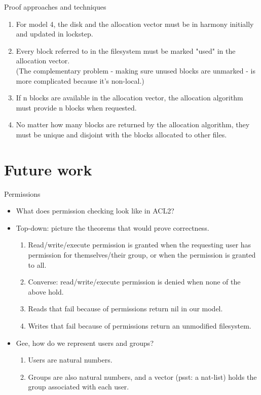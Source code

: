 \documentclass{beamer}
\begin{document}
\begin{frame}{Proof approaches and techniques}
  \begin{enumerate}
  \item For model 4, the disk and the allocation vector must be in harmony
    initially and updated in lockstep.
  \item Every block referred to in the filesystem must be marked
    "used" in the allocation vector.\\
    (The complementary problem - making sure unused
      blocks are unmarked - is more complicated because it's non-local.)
  \item If n blocks are available in the allocation vector, the
    allocation algorithm must provide n blocks when requested.
  \item No matter how many blocks are returned by the allocation
    algorithm, they must be unique and disjoint with the blocks
    allocated to other files.
  \end{enumerate}
\end{frame}

\section{Future work}

\begin{frame}{Permissions}
  \begin{itemize}
  \item What does permission checking look like in ACL2?
  \item Top-down: picture the theorems that would prove correctness.
    \begin{enumerate}
    \item Read/write/execute permission is granted when the requesting
      user has permission for themselves/their group, or when the
      permission is granted to all.
    \item Converse: read/write/execute permission is denied when none
      of the above hold.
    \item Reads that fail because of permissions return nil in our
      model.
    \item Writes that fail because of permissions return an unmodified
      filesystem.
    \end{enumerate}
  \item Gee, how do we represent users and groups?
    \begin{enumerate}
    \item Users are natural numbers.
    \item Groups are also natural numbers, and a vector (psst: a
      nat-list) holds the group associated with each user.
    \end{enumerate}
  \end{itemize}
\end{frame}
\end{document}
